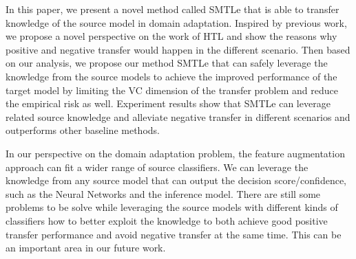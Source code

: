 In this paper, we present a novel method called SMTLe that is able to transfer knowledge of the source model in domain adaptation. Inspired by previous work,
we propose a novel perspective on the work of HTL and show the reasons why positive and negative transfer would happen in the different scenario. Then based on our analysis, we propose our method SMTLe that can safely leverage the knowledge from the source models to achieve the improved performance of the target model by limiting the VC dimension of the transfer problem and reduce the empirical risk as well. Experiment results show that SMTLe can leverage related source knowledge and alleviate negative transfer in different scenarios and outperforms other baseline methods.

In our perspective on the domain adaptation problem, the feature augmentation approach can fit a wider range of source classifiers. We can leverage the knowledge from any source model that can output the decision score/confidence, such as the Neural Networks and the inference model. There are still some problems to be solve while leveraging the source models with different kinds of classifiers how to better exploit the knowledge to both achieve good positive transfer performance and avoid negative transfer at the same time. This can be an important area in our future work.

